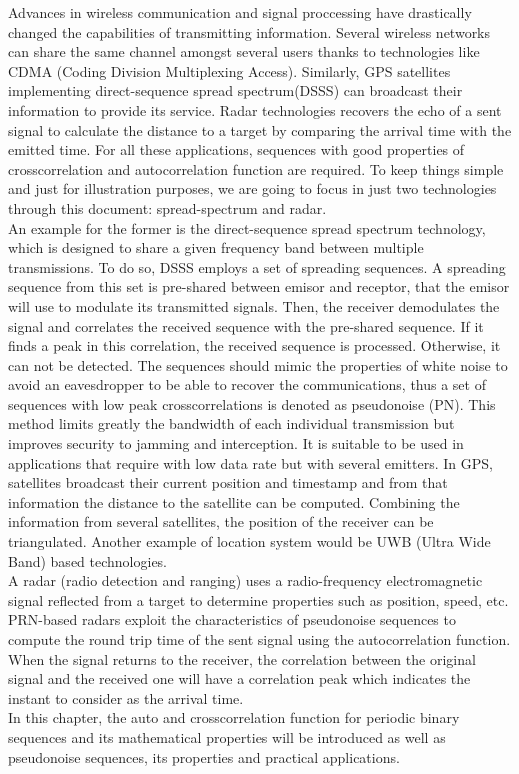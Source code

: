 Advances in wireless communication and signal proccessing have drastically
changed the capabilities of transmitting information. Several wireless
networks can share the same channel amongst several users thanks to technologies like
CDMA (Coding Division Multiplexing Access). Similarly, GPS \cite{GPS} satellites implementing direct-sequence spread
spectrum(DSSS) can broadcast their information to provide its service.  Radar technologies recovers the echo of a sent signal to calculate
the distance to a target by comparing the arrival time with the emitted time. For all these applications, sequences with good properties
of crosscorrelation and autocorrelation function are required. To keep things simple and just for illustration purposes, we are going to focus in just
two technologies through this document: spread-spectrum and radar. \\

An example for the former is the direct-sequence spread spectrum technology\cite{DSSS_1}\cite{DSSS}, which is
designed to share a given frequency band between multiple transmissions.
To do so, DSSS employs a set of spreading sequences. A spreading sequence from this set is pre-shared
between emisor and receptor, that the emisor will use to modulate its transmitted signals. Then, the receiver demodulates the signal and correlates the received
sequence with the pre-shared sequence. If it finds a peak in this correlation, the received sequence is processed. Otherwise, it can not be detected.
The sequences should mimic the properties of white noise to avoid an eavesdropper to be able to recover the communications, thus  a set of  sequences with low peak
crosscorrelations is denoted as pseudonoise (PN). This method limits greatly the bandwidth of each individual transmission but improves security to
jamming and interception.  It is  suitable to be used in applications that require with low data rate but with several emitters.  In GPS, satellites broadcast their current position and timestamp and from that information the distance to the satellite can be computed. Combining the information from several satellites, the position of the receiver can be triangulated. Another example of location system would be UWB (Ultra Wide Band) based technologies.\\

A radar (radio detection and ranging) uses a radio-frequency electromagnetic
signal reflected from a target to determine properties such as position, speed,
etc.  PRN-based radars\cite{prn_radar_example1}\cite{prn_radar_example2}  exploit the characteristics of pseudonoise sequences to compute the
round trip time of the sent signal using the autocorrelation function. When
the signal returns to the receiver, the correlation between the original
signal and the received one will have a correlation peak which indicates
the instant to consider as the arrival time.\\

In this chapter, the auto and crosscorrelation function for
periodic binary sequences and its mathematical properties will be introduced
as well as pseudonoise sequences, its properties and practical applications.

 

